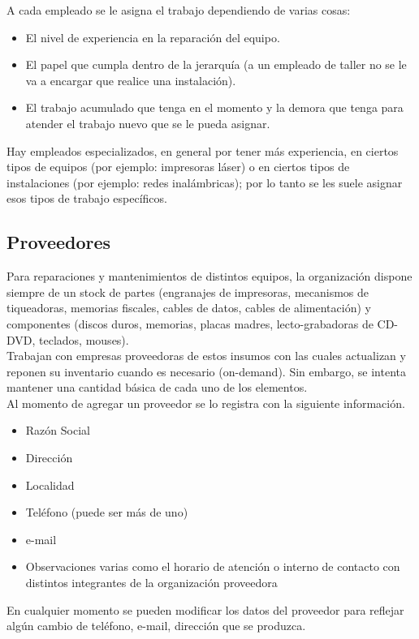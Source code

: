 \documentclass[12pt]{extarticle}
\begin{document}
\begin{spacing}{1.2}
        A cada empleado se le asigna el trabajo dependiendo de varias cosas:
        \begin{itemize}
            \item El nivel de experiencia en la reparación del equipo.
            \item El papel que cumpla dentro de la jerarquía (a un empleado de taller no se le va a encargar que realice una instalación).
            \item El trabajo acumulado que tenga en el momento y la demora que tenga para atender el trabajo nuevo que se le pueda asignar. 
        \end{itemize}

        Hay empleados especializados, en general por tener más experiencia, en ciertos tipos de equipos (por ejemplo: impresoras láser) o en ciertos tipos de instalaciones (por ejemplo: redes inalámbricas); por lo tanto se les suele asignar esos tipos de trabajo específicos.

        \pagebreak
        \subsection{Proveedores}
        Para reparaciones y mantenimientos de distintos equipos, la organización dispone siempre de un stock de partes (engranajes de impresoras, mecanismos de tiqueadoras, memorias fiscales, cables de datos, cables de alimentación) y componentes (discos duros, memorias, placas madres, lecto-grabadoras de CD-DVD, teclados, mouses).\\

        Trabajan con empresas proveedoras de estos insumos con las cuales actualizan y reponen su inventario cuando es necesario (on-demand). Sin embargo, se intenta mantener una cantidad básica de cada uno de los elementos.\\

        Al momento de agregar un proveedor se lo registra con la siguiente información.
            \begin{itemize}
                \item Razón Social
                \item Dirección
                \item Localidad
                \item Teléfono (puede ser más de uno)
                \item e-mail
                \item Observaciones varias como el horario de atención o interno de contacto con distintos integrantes de la organización proveedora
            \end{itemize}
        En cualquier momento se pueden modificar los datos del proveedor para reflejar algún cambio de teléfono, e-mail, dirección que se produzca.


\end{spacing}
\end{document}
